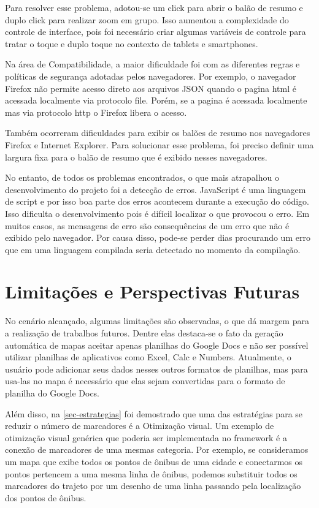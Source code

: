 Para resolver esse problema, adotou-se um click para abrir o balão de resumo e duplo click para realizar zoom em grupo. Isso aumentou a complexidade do controle de interface, pois foi necessário criar algumas variáveis de controle para tratar o toque e duplo toque no contexto de tablets e smartphones.

Na área de Compatibilidade, a maior dificuldade foi com as diferentes regras e políticas de segurança adotadas pelos navegadores. Por exemplo, o navegador Firefox não permite acesso direto aos arquivos JSON quando o pagina html é acessada localmente via protocolo file. Porém, se a pagina é acessada localmente mas via protocolo http o Firefox libera o acesso. 

Também ocorreram dificuldades para exibir os balões de resumo nos navegadores Firefox e Internet Explorer. Para solucionar esse problema, foi preciso definir uma largura fixa para o balão de resumo que é exibido nesses navegadores.
 
No entanto, de todos os problemas encontrados, o que mais atrapalhou o desenvolvimento do projeto foi a detecção de erros. JavaScript é uma linguagem de script  e por isso boa parte dos erros acontecem durante a execução do código. Isso dificulta o desenvolvimento pois é difícil localizar o que provocou o erro. Em muitos casos, as mensagens de erro são consequências de um erro que não é exibido pelo navegador. Por causa disso, pode-se perder dias procurando um erro que em uma linguagem compilada seria detectado no momento da compilação.


\section{Limitações e Perspectivas Futuras}


No cenário alcançado, algumas limitações são observadas, o que dá margem para a realização de trabalhos futuros. Dentre elas destaca-se o fato da geração automática de mapas aceitar apenas planilhas do Google Docs e não ser possível utilizar planilhas de aplicativos como Excel, Calc e Numbers. Atualmente, o usuário pode adicionar seus dados nesses outros formatos de planilhas, mas para usa-las no mapa  é necessário que elas sejam convertidas para  o formato de planilha do Google Docs.

Além disso, na \autoref{sec-estrategias} foi demostrado que uma das estratégias para se reduzir o número de marcadores é a Otimização visual. Um exemplo de otimização visual genérica que poderia ser implementada no framework é a conexão de marcadores de uma mesmas categoria. Por exemplo, se consideramos um mapa que exibe todos os pontos de ônibus de uma cidade e conectarmos os pontos pertencem a uma mesma linha de ônibus, podemos substituir todos os marcadores do trajeto por um desenho de uma linha passando pela localização dos pontos de ônibus. 

